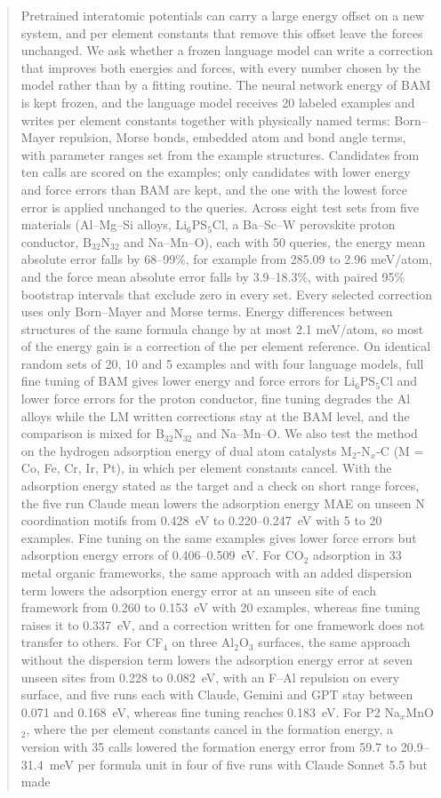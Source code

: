 \begin{abstract}
\ifbulk
Pretrained interatomic potentials can carry a large energy offset on a new system, and per element constants that remove this offset leave the forces unchanged. We ask whether a frozen language model can write a correction that improves both energies and forces, with every number chosen by the model rather than by a fitting routine. The neural network energy of BAM is kept frozen, and the language model receives 20 labeled examples and writes per element constants together with physically named terms: Born--Mayer repulsion, Morse bonds, embedded atom and bond angle terms, with parameter ranges set from the example structures. Candidates from ten calls are scored on the examples; only candidates with lower energy and force errors than BAM are kept, and the one with the lowest force error is applied unchanged to the queries. Across eight test sets from five materials (Al--Mg--Si alloys, $\mathrm{Li_6PS_5Cl}$, a Ba--Sc--W perovskite proton conductor, $\mathrm{B_{32}N_{32}}$ and Na--Mn--O), each with 50 queries, the energy mean absolute error falls by 68--99\%, for example from 285.09 to 2.96 meV/atom, and the force mean absolute error falls by 3.9--18.3\%, with paired 95\% bootstrap intervals that exclude zero in every set. Every selected correction uses only Born--Mayer and Morse terms. Energy differences between structures of the same formula change by at most 2.1 meV/atom, so most of the energy gain is a correction of the per element reference. On identical random sets of 20, 10 and 5 examples and with four language models, full fine tuning of BAM gives lower energy and force errors for $\mathrm{Li_6PS_5Cl}$ and lower force errors for the proton conductor, fine tuning degrades the Al alloys while the LM written corrections stay at the BAM level, and the comparison is mixed for $\mathrm{B_{32}N_{32}}$ and Na--Mn--O. We also test the method on the hydrogen adsorption energy of dual atom catalysts M$_2$-N$_x$-C (M = Co, Fe, Cr, Ir, Pt), in which per element constants cancel. With the adsorption energy stated as the target and a check on short range forces, the five run Claude mean lowers the adsorption energy MAE on unseen N coordination motifs from 0.428~eV to 0.220--0.247~eV with 5 to 20 examples. Fine tuning on the same examples gives lower force errors but adsorption energy errors of 0.406--0.509~eV. For CO$_2$ adsorption in 33 metal organic frameworks, the same approach with an added dispersion term lowers the adsorption energy error at an unseen site of each framework from 0.260 to 0.153~eV with 20 examples, whereas fine tuning raises it to 0.337~eV, and a correction written for one framework does not transfer to others. For CF$_4$ on three Al$_2$O$_3$ surfaces, the same approach without the dispersion term lowers the adsorption energy error at seven unseen sites from 0.228 to 0.082~eV, with an F--Al repulsion on every surface, and five runs each with Claude, Gemini and GPT stay between 0.071 and 0.168~eV, whereas fine tuning reaches 0.183~eV. For P2 Na$_x$MnO$_2$, where the per element constants cancel in the formation energy, a version with 35 calls lowered the formation energy error from 59.7 to 20.9--31.4~meV per formula unit in four of five runs with Claude Sonnet 5.5 but made 
\end{abstract}
